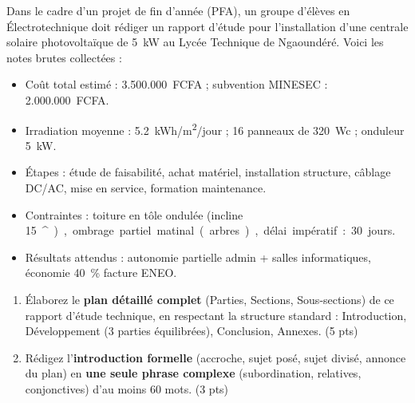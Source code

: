 \documentclass[11pt]{article}
\providecommand{\degree}{^{\circ}}
\begin{document}
\begin{exercice}
Dans le cadre d'un projet de fin d'année (PFA), un groupe d'élèves en Électrotechnique doit rédiger un rapport d'étude pour l'installation d'une centrale solaire photovoltaïque de \SI{5}{kW} au Lycée Technique de Ngaoundéré. Voici les notes brutes collectées :

\begin{itemize}
\item Coût total estimé : \SI{3.500.000}{FCFA} ; subvention MINESEC : \SI{2.000.000}{FCFA}.
\item Irradiation moyenne : \SI{5.2}{kWh/m^2/jour} ; 16 panneaux de \SI{320}{Wc} ; onduleur \SI{5}{kW}.
\item Étapes : étude de faisabilité, achat matériel, installation structure, câblage DC/AC, mise en service, formation maintenance.
\item Contraintes : toiture en tôle ondulée (incline \SI{15}{\degree}), ombrage partiel matinal (arbres), délai impératif : 30 jours.
\item Résultats attendus : autonomie partielle admin + salles informatiques, économie \SI{40}{\%} facture ENEO.
\end{itemize}

\begin{enumerate}
\item Élaborez le \textbf{plan détaillé complet} (Parties, Sections, Sous-sections) de ce rapport d'étude technique, en respectant la structure standard : Introduction, Développement (3 parties équilibrées), Conclusion, Annexes. \hfill (5 pts)
\item Rédigez l'\textbf{introduction formelle} (accroche, sujet posé, sujet divisé, annonce du plan) en \textbf{une seule phrase complexe} (subordination, relatives, conjonctives) d'au moins 60 mots. \hfill (3 pts)
\end{enumerate}
\end{exercice}
\end{document}
